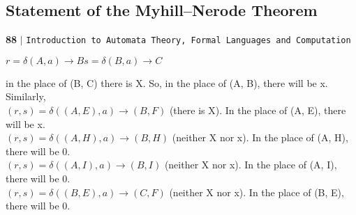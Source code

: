 \documentclass[8pt]{beamer}
\begin{document}
\begin{frame}
\section*{Statement of the Myhill–Nerode Theorem}
\begin{flushleft}
    \textbf{88}\hspace*{0.1cm} \textbf{$|$} \hspace*{0.1cm} \texttt{Introduction to Automata Theory, Formal Languages and Computation}
  \end{flushleft}

\vspace*{0.5cm}
\begin{center}
  $r = \delta(A, a) \rightarrow B s = \delta(B, a) \rightarrow C$
\end{center}
in the place of (B, C) there is X. So, in the place of (A, B), there will be x.\\
\hspace*{0.4cm} Similarly,\\

\vspace*{0.1cm}
\hspace*{0.4cm} $(r, s) = \delta((A, E), a) \rightarrow (B, F)$ (there is X). In the place of (A, E), there will be x.\\
\hspace*{0.4cm} $(r, s) = \delta((A, H), a) \rightarrow (B, H)$ (neither X nor x). In the place of (A, H), there will be 0.\\
\hspace*{0.4cm} $(r, s) = \delta((A, I), a) \rightarrow (B, I)$ (neither X nor x). In the place of (A, I), there will be 0.\\
\hspace*{0.4cm} $(r, s) = \delta((B, E), a) \rightarrow (C, F)$ (neither X nor x). In the place of (B, E), there will be 0.\\
\end{frame}
\end{document}
